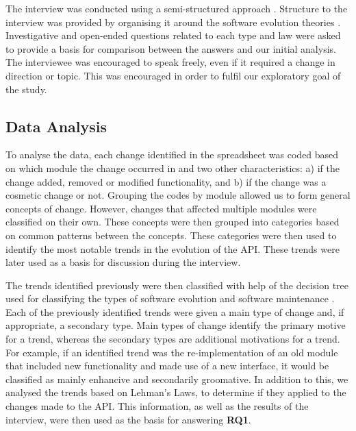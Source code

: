 \documentclass{sig-alternate}
\begin{document}
The interview was conducted using a semi-structured approach \cite{robson2002real}. Structure to the interview was provided by organising it around the software evolution theories \cite{chapin2001types, lehman90sview}. Investigative and open-ended questions related to each type and law were asked to provide a basis for comparison between the answers and our initial analysis. The interviewee was encouraged to speak freely, even if it required a change in direction or topic. This was encouraged in order to fulfil our exploratory goal of the study. 




\subsection{Data Analysis} \label{data_analysis}

To analyse the data, each change identified in the spreadsheet was coded based on which module the change occurred in and two other characteristics: a) if the change added, removed or modified functionality, and b) if the change was a cosmetic change or not.
Grouping the codes by module allowed us to form general concepts of change. However, changes that affected multiple modules were classified on their own.
These concepts were then grouped into categories based on common patterns between the concepts.
These categories were then used to identify the most notable trends in the evolution of the API. These trends were later used as a basis for discussion during the interview.

The trends identified previously were then classified with help of the decision tree used for classifying the types of software evolution and software maintenance \cite{chapin2001types}. Each of the previously identified trends were given a main type of change and, if appropriate, a secondary type. Main types of change identify the primary motive for a trend, whereas the secondary types are additional motivations for a trend. For example, if an identified trend was the re-implementation of an old module that included new functionality and made use of a new interface, it would be classified as mainly enhancive and secondarily groomative. In addition to this, we analysed the trends based on Lehman's Laws, to determine if they applied to the changes made to the API. This information, as well as the results of the interview, were then used as the basis for answering \textbf{RQ1}.
\end{document}

